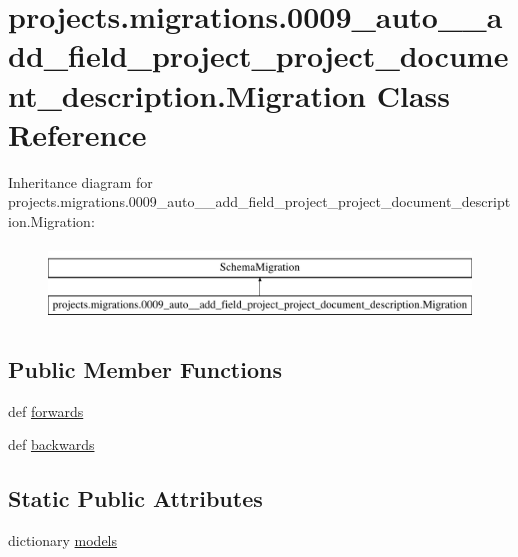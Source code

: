 \hypertarget{classprojects_1_1migrations_1_10009__auto____add__field__project__project__document__description_1_1_migration}{\section{projects.\-migrations.0009\-\_\-auto\-\_\-\-\_\-add\-\_\-field\-\_\-project\-\_\-project\-\_\-document\-\_\-description.Migration Class Reference}
\label{classprojects_1_1migrations_1_10009__auto____add__field__project__project__document__description_1_1_migration}
}
Inheritance diagram for projects.\-migrations.0009\-\_\-auto\-\_\-\-\_\-add\-\_\-field\-\_\-project\-\_\-project\-\_\-document\-\_\-description.Migration\-:\begin{figure}[H]
\begin{center}
\leavevmode
\includegraphics[height=2.000000cm]{classprojects_1_1migrations_1_10009__auto____add__field__project__project__document__description_1_1_migration}
\end{center}
\end{figure}
\subsection*{Public Member Functions}
\begin{DoxyCompactItemize}
\item 
def \hyperlink{classprojects_1_1migrations_1_10009__auto____add__field__project__project__document__description_1_1_migration_ad9aff02a33d7ea3fb9d87c3c729842e6}{forwards}
\item 
def \hyperlink{classprojects_1_1migrations_1_10009__auto____add__field__project__project__document__description_1_1_migration_a42c75e3641f82ab409de1b0999a1caf1}{backwards}
\end{DoxyCompactItemize}
\subsection*{Static Public Attributes}
\begin{DoxyCompactItemize}
\item 
dictionary \hyperlink{classprojects_1_1migrations_1_10009__auto____add__field__project__project__document__description_1_1_migration_ab13a3e916939d8719470c28854235e3b}{models}
\end{DoxyCompactItemize}


